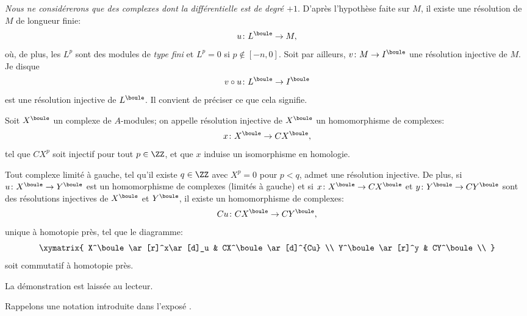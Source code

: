 \emph{Nous ne consid\'ererons que des complexes dont la diff\'erentielle est de degr\'e $+1$}. D'apr\`es l'hypoth\`ese faite sur $M$, il existe une r\'esolution  de $M$ de longueur finie:
\[u\colon L^\boule \to M, \]
o\`u, de plus, les $L^p$ sont des modules de \emph{type fini} et $L^p=0$ si $p\not\in[-n, 0]$. Soit par ailleurs, $v\colon M\to I^\boule$ une r\'esolution injective de $M$. Je dis\pageoriginale que
\begin{equation} \label{eq:VIII.1.1} v\circ u\colon L^\boule\to I^\boule
\end{equation}
est une r\'esolution injective de $L^\boule$. Il convient de pr\'eciser ce que cela signifie.

\begin{definition} \label{VIII.1.3} Soit $X^\boule$ un complexe de $A$-modules; on appelle r\'esolution injective de $X^\boule$ un homomorphisme de complexes:
\[x\colon X^\boule\to CX^\boule, \]
tel que $CX^p$ soit injectif pour tout $p\in \ZZ$, et que $x$ induise un isomorphisme en homologie.
\end{definition}

\begin{proposition} \label{VIII.1.4} Tout complexe limit\'e \`a gauche, \ie tel qu'il existe $q\in\ZZ$ avec $X^p=0$ pour $p<q$, admet une r\'esolution injective. De plus, si $u\colon X^\boule\to Y^\boule$ est un homomorphisme de complexes (limit\'es \`a gauche) et si $x\colon X^\boule \to CX^\boule$ et $y\colon Y^\boule\to CY^\boule$ sont des r\'esolutions injectives de $X^\boule$ et $Y^\boule$, il existe un homomorphisme de complexes:
\[Cu\colon CX^\boule\to CY^\boule, \]
unique \`a homotopie pr\`es, tel que le diagramme:
\[
\xymatrix{ X^\boule \ar[r]^x\ar[d]_u & CX^\boule\ar[d]^{Cu} \\
Y^\boule \ar[r]^y & CY^\boule \\
}\]
soit commutatif \`a homotopie pr\`es.
\end{proposition}

La d\'emonstration est laiss\'ee au lecteur.

Rappelons une notation introduite dans l'expos\'e .


